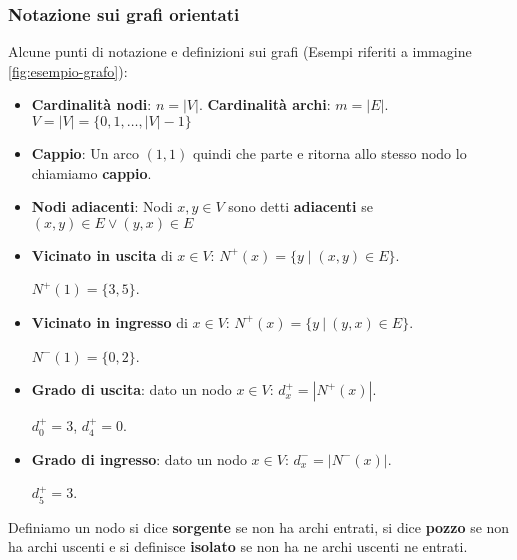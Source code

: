 \subsubsection{Notazione sui grafi orientati}
Alcune punti di notazione e definizioni sui grafi (Esempi riferiti a immagine \ref{fig:esempio-grafo}):
\begin{itemize}
    \item \textbf{Cardinalità nodi}: $n = \lvert V \rvert $. \hspace{.5cm} \textbf{Cardinalità archi}: $m = \lvert E \rvert$. \hspace{.5cm} $V = \lvert V\rvert = \{0,1,\ldots, \lvert V\rvert-1\}$
    \item \textbf{Cappio}: Un arco $(1,1)$ quindi che parte e ritorna allo stesso nodo lo chiamiamo \textbf{cappio}.
    \item \textbf{Nodi adiacenti}: Nodi $x,y \in V$ sono detti \textbf{adiacenti} se $(x,y) \in E \lor (y,x) \in E$
    \item \textbf{Vicinato in uscita} di $x \in V$: \hspace{.7cm} $N^+(x) = \{y \mid (x,y) \in E\}$.
    \begin{example}
        $N^+(1) = \{3,5\}$.
    \end{example}
    \item \textbf{Vicinato in ingresso} di $x \in V$: \hspace{.7cm} $N^+(x) = \{y \: | \: (y,x) \in E\}$.
    \begin{example}
        $N^-(1) = \{0,2\}$.
    \end{example}
    \item \textbf{Grado di uscita}: dato un nodo $x \in V$: \hspace{.7cm} $d^+_x = |N^+(x)|$.
    \begin{example}
        $d^+_0 = 3$, $d^+_4 = 0$.
    \end{example}
    \item \textbf{Grado di ingresso}: dato un nodo $x \in V$: \hspace{.7cm} $d^-_x = |N^-(x)|$.
    \begin{example}
        $d^+_5 = 3$.
    \end{example}
\end{itemize}

\begin{definition}
    Definiamo un nodo si dice \textbf{sorgente} se non ha archi entrati, si dice \textbf{pozzo} se non ha archi uscenti e si definisce \textbf{isolato} se non ha ne archi uscenti ne entrati.
\end{definition}

